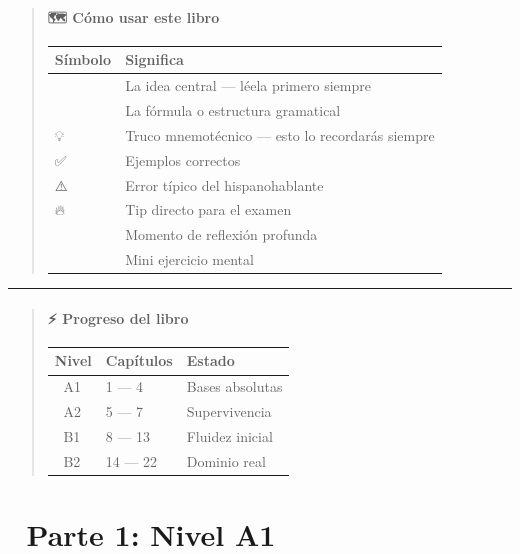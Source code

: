 \documentclass[
  spanish,
  letterpaper,
]{scrbook}
\begin{document}
\begin{quote}
\subsection{🗺️ Cómo usar este libro}\label{cuxf3mo-usar-este-libro}

\begin{longtable}[]{@{}ll@{}}
\toprule\noalign{}
Símbolo & Significa \\
\midrule\noalign{}
\endhead
\bottomrule\noalign{}
\endlastfoot
🎯 & La idea central --- léela primero siempre \\
📐 & La fórmula o estructura gramatical \\
💡 & Truco mnemotécnico --- esto lo recordarás siempre \\
✅ & Ejemplos correctos \\
⚠️ & Error típico del hispanohablante \\
🔥 & Tip directo para el examen \\
🧠 & Momento de reflexión profunda \\
📝 & Mini ejercicio mental \\
\end{longtable}
\end{quote}

\begin{center}\rule{0.5\linewidth}{0.5pt}\end{center}

\begin{quote}
\subsection{⚡ Progreso del libro}\label{progreso-del-libro}

\begin{longtable}[]{@{}lll@{}}
\toprule\noalign{}
Nivel & Capítulos & Estado \\
\midrule\noalign{}
\endhead
\bottomrule\noalign{}
\endlastfoot
📘 A1 & 1 --- 4 & Bases absolutas \\
📗 A2 & 5 --- 7 & Supervivencia \\
📙 B1 & 8 --- 13 & Fluidez inicial \\
📕 B2 & 14 --- 22 & Dominio real \\
\end{longtable}
\end{quote}

\part{📘 Parte 1: Nivel A1}
\end{document}
